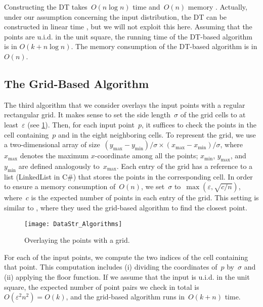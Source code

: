 Constructing the DT takes~$O(n\log n)$ time 
and~$O(n)$ memory \parencite{Leach1992Delaunay}. 
Actually, under our assumption concerning the input 
distribution, the DT can be constructed in linear time
\parencite{Buchin2009_Delaunay}, 
but we will not exploit this here. 
Assuming that the points are u.i.d. in the unit square, 
the running time of the DT-based algorithm 
is in $O(k+n\log n)$. 
The memory consumption of the DT-based algorithm is in $O(n)$.


\subsection{The Grid-Based Algorithm}
\label{sec:DataStr_GridAlgorithm}

The third algorithm that 
we consider overlays the input points with a 
regular rectangular grid. 
It makes sense to set the side length~$\sigma$ of the grid cells 
to at least~$\varepsilon$
(see \fig\ref{fig:DataStr_Grid}). 
Then, for each input point~$p$, 
it suffices to check the points in the cell containing~$p$ 
and in the eight neighboring cells. 
To represent the grid, 
we use a two-dimensional array of 
size~$(y_\mathrm{max}-y_\mathrm{min})/\sigma \times 
(x_\mathrm{max}-x_\mathrm{min})/\sigma $, 
where~$x_\mathrm{max}$ denotes the maximum $x$-coordinate 
among all the points; 
$x_\mathrm{min}$, $y_\mathrm{max}$, and~$y_\mathrm{min}$ are 
defined analogously to~$x_\mathrm{max}$. 
Each entry of the grid has a reference 
to a list (LinkedList in C\#) 
that stores the points in the corresponding cell. 
In order to ensure a memory consumption of~$O(n)$, 
we set~$\sigma$ to~$\max (\varepsilon ,\sqrt{c/n})$, 
where~$c$ is the expected number of points 
in each entry of the grid.
This setting is similar to \textcite{Bentley1980Closest}, 
where they used the grid-based algorithm to find the closest 
point.

\begin{figure}[tb]
\centering
\texttt{[image: DataStr\_Algorithms]}
\caption{Overlaying the points with a grid.}
\label{fig:DataStr_Grid}
\end{figure}

For each of the input points,
we compute the two indices of the cell containing that point.
This computation includes 
(i) dividing the coordinates of~$p$ by~$\sigma$ and 
(ii) applying the floor function. 
If we assume that the input is u.i.d. in the unit square, 
the expected number of point pairs 
we check in total is~$O(\varepsilon ^{2}n^{2})=O(k)$, 
and the grid-based algorithm runs in~$O(k+n)$ time.





